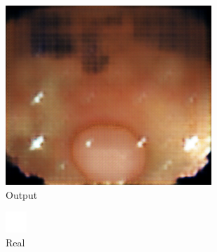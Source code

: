 \begin{figure}
\begin{subfigure}{.19\textwidth}
		\includegraphics[width=.9\linewidth]{img/results/btoa_output}
		\caption{Output}
	\end{subfigure}
	\begin{subfigure}{.19\textwidth}
		\centering
		\includegraphics[width=.9\linewidth,interpolate=false]{img/results/btoa_real}
		\caption{Real}
	\end{subfigure}
	\begin{subfigure}{.19\textwidth}
		\centering

\end{subfigure}
\end{figure}
